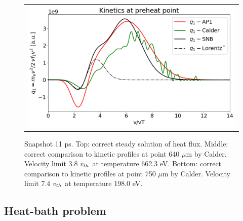 \begin{figure}[htb]
\begin{center}
\begin{tabular}{c}
	  \includegraphics[width=\figscale\textwidth]{../VFPdata/C7_Calder_case1_nonlocal_kinetics.png}
    \end{tabular}
  \caption{  
  Snapshot 11 ps. Top: correct steady solution of heat flux.  
  Middle: correct comparison to kinetic profiles at point 640 $\mu$m by Calder. 
  Velocity limit 3.8 $v_{th}$ at temperature 662.3 eV.
  Bottom: correct comparison to kinetic profiles at point 750 $\mu$m by Calder.
  Velocity limit 7.4 $v_{th}$ at temperature 198.0 eV.
  }
  \label{fig:C7_Calder_case1}
  \end{center} 
\end{figure}

\subsection{Heat-bath problem}  
\label{sec:heatbath_test}

